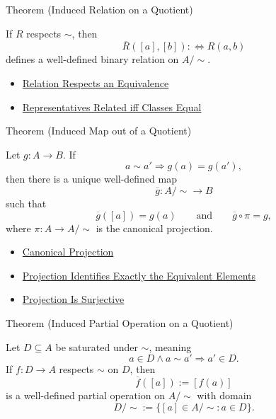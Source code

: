 \begin{theorembox}{Theorem (Induced Relation on a Quotient)}
\begin{theorem}
\label{thm:induced-relation-on-quotient}
If $R$ respects $\sim$, then
\[
\overline{R}([a],[b]):\Longleftrightarrow R(a,b)
\]
defines a well-defined binary relation on $A/{\sim}$.
\end{theorem}
\end{theorembox}

\begin{dependencies}
\begin{itemize}
  \item \hyperref[def:relation-respects-equivalence]{Relation Respects an Equivalence}
  \item \hyperref[prop:representatives-related-iff-classes-equal]{Representatives Related iff Classes Equal}
\end{itemize}
\end{dependencies}

\begin{theorembox}{Theorem (Induced Map out of a Quotient)}
\begin{theorem}
\label{thm:induced-map-out-of-quotient}
Let $g:A\to B$. If
\[
a\sim a'\Longrightarrow g(a)=g(a'),
\]
then there is a unique well-defined map
\[
\overline{g}:A/{\sim}\to B
\]
such that
\[
\overline{g}([a])=g(a)
\qquad\text{and}\qquad
\overline{g}\circ\pi=g,
\]
where $\pi:A\to A/{\sim}$ is the canonical projection.
\end{theorem}
\end{theorembox}

\begin{dependencies}
\begin{itemize}
  \item \hyperref[def:canonical-projection]{Canonical Projection}
  \item \hyperref[prop:projection-identifies-equivalent-elements]{Projection Identifies Exactly the Equivalent Elements}
  \item \hyperref[prop:projection-is-surjective]{Projection Is Surjective}
\end{itemize}
\end{dependencies}

\begin{theorembox}{Theorem (Induced Partial Operation on a Quotient)}
\begin{theorem}
\label{thm:induced-partial-operation-on-quotient}
Let $D\subseteq A$ be saturated under $\sim$, meaning
\[
a\in D\land a\sim a'\Longrightarrow a'\in D.
\]
If $f:D\to A$ respects $\sim$ on $D$, then
\[
\overline{f}([a]):=[f(a)]
\]
is a well-defined partial operation on $A/{\sim}$ with domain
\[
D/{\sim}:=\{[a]\in A/{\sim}:a\in D\}.
\]
\end{theorem}
\end{theorembox}

